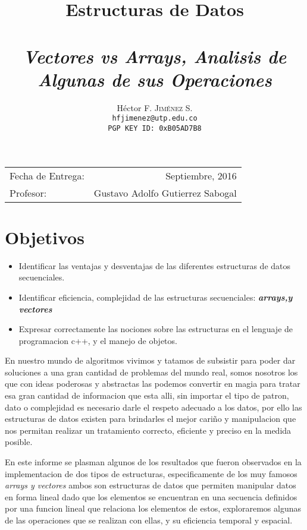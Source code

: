 \documentclass[paper=a4, fontsize=12pt]{article} 		%
\title{Estructuras de Datos\\ 
\horrule{0.5pt} \\[0.4cm] 								%
\textit{Vectores vs Arrays, Analisis de Algunas de sus Operaciones}
\horrule{1pt} \\[0.5cm] 			
} 			%
\author{												%
Héctor F. \textsc{Jiménez S.}\\
\texttt{hfjimenez@utp.edu.co} \\
\texttt{PGP KEY ID: 0xB05AD7B8}} 												       %
\date{}    						                       %
\numberwithin{equation}{section}						%
\numberwithin{table}{section} 							%
\begin{document}
\maketitle                      			           %
\begin{center}
\begin{tabular}{l r}								   %
Fecha de Entrega: & Septiembre, 2016 \\				   %
Profesor: & Gustavo Adolfo Gutierrez Sabogal
\end{tabular}
\end{center}
\section{Objetivos}
\begin{itemize}
   \item Identificar las ventajas y desventajas de las diferentes estructuras de datos secuenciales.
  \item Identificar eficiencia, complejidad de las estructuras secuenciales: \textbf{\textit{arrays,y vectores}} 
  \item Expresar correctamente las nociones sobre las estructuras en el lenguaje de programacion c++, y el manejo de objetos.
\end{itemize}
En nuestro mundo de algoritmos vivimos y tatamos de subsistir para poder dar soluciones a una gran cantidad de problemas del mundo real, somos nosotros los que con ideas poderosas y abstractas las podemos convertir en magia para tratar esa gran cantidad de informacion que esta alli, sin importar el tipo de patron, dato o complejidad es necesario darle el respeto adecuado a los datos, por ello las estructuras de datos existen para brindarles el mejor cariño y manipulacion que nos permitan realizar un tratamiento correcto, eficiente y preciso en la medida posible. 

En este informe se plasman algunos de los resultados que fueron observados en la implementacion de dos tipos de estructuras, especificamente de los muy famosos \emph{arrays y vectores} ambos son estructuras de datos que permiten manipular datos en forma lineal dado que  los elementos se encuentran en una secuencia definidos por una funcion lineal que relaciona los elementos de estos, exploraremos algunas de las operaciones que se realizan con ellas, y su eficiencia temporal y espacial.
\end{document}
